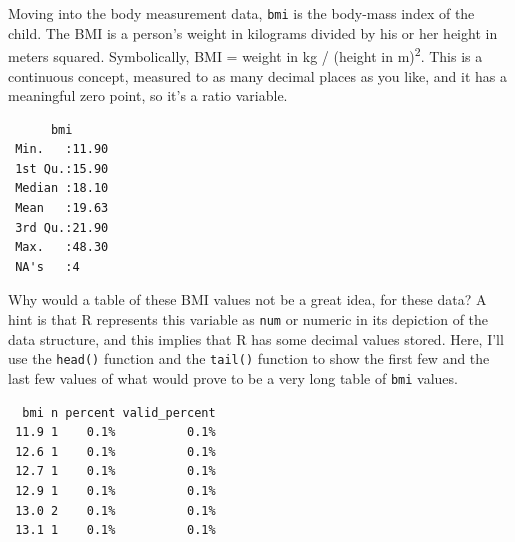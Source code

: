 \documentclass[
]{book}
\newenvironment{Shaded}{\begin{snugshade}}{\end{snugshade}}
\newcommand{\KeywordTok}[1]{\textcolor[rgb]{0.13,0.29,0.53}{\textbf{#1}}}
\newcommand{\NormalTok}[1]{#1}
\newcommand{\OperatorTok}[1]{\textcolor[rgb]{0.81,0.36,0.00}{\textbf{#1}}}
\newcommand{\StringTok}[1]{\textcolor[rgb]{0.31,0.60,0.02}{#1}}
\begin{document}
Moving into the body measurement data, \texttt{bmi} is the body-mass index of the child. The BMI is a person's weight in kilograms divided by his or her height in meters squared. Symbolically, BMI = weight in kg / (height in m)\textsuperscript{2}. This is a continuous concept, measured to as many decimal places as you like, and it has a meaningful zero point, so it's a ratio variable.

\begin{Shaded}
\end{Shaded}

\begin{verbatim}
      bmi       
 Min.   :11.90  
 1st Qu.:15.90  
 Median :18.10  
 Mean   :19.63  
 3rd Qu.:21.90  
 Max.   :48.30  
 NA's   :4      
\end{verbatim}

Why would a table of these BMI values not be a great idea, for these data? A hint is that R represents this variable as \texttt{num} or numeric in its depiction of the data structure, and this implies that R has some decimal values stored. Here, I'll use the \texttt{head()} function and the \texttt{tail()} function to show the first few and the last few values of what would prove to be a very long table of \texttt{bmi} values.

\begin{Shaded}
\end{Shaded}

\begin{verbatim}
  bmi n percent valid_percent
 11.9 1    0.1%          0.1%
 12.6 1    0.1%          0.1%
 12.7 1    0.1%          0.1%
 12.9 1    0.1%          0.1%
 13.0 2    0.1%          0.1%
 13.1 1    0.1%          0.1%
\end{verbatim}

\begin{Shaded}
\end{Shaded}
\end{document}
